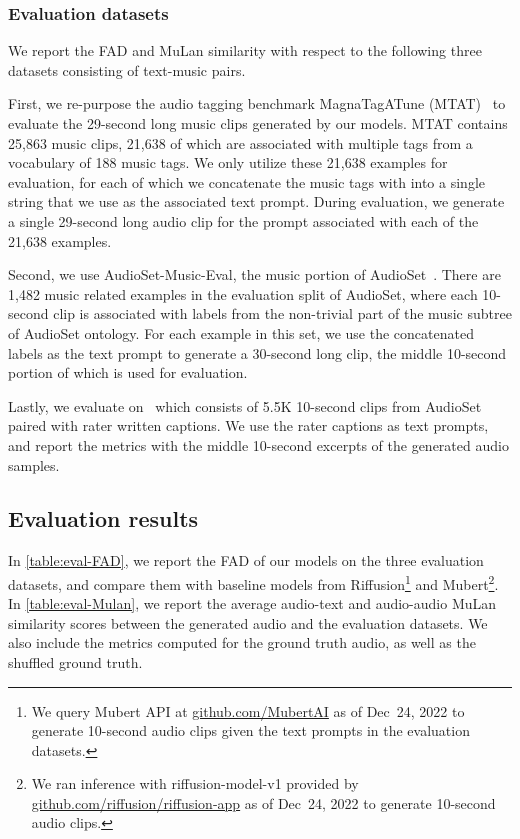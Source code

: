 \subsubsection{Evaluation datasets}

We report the FAD and MuLan similarity with respect to the following three datasets consisting of text-music pairs.

First, we re-purpose the audio tagging benchmark MagnaTagATune (MTAT)~\cite{law2009evaluation} to evaluate the 29-second long music clips generated by our models.
MTAT contains 25,863 music clips, 21,638 of which are associated with multiple tags from a vocabulary of 188 music tags. We only utilize these 21,638 examples for evaluation, for each of which we concatenate the music tags with into a single string that we use as the associated text prompt. During evaluation, we generate a single 29-second long audio clip for the prompt associated with each of the 21,638 examples.

Second, we use AudioSet-Music-Eval, the music portion of AudioSet~\cite{gemmeke2017audio}. There are 1,482 music related examples in the evaluation split of AudioSet, where each 10-second clip is associated with labels from the non-trivial part of the music subtree of AudioSet ontology. For each example in this set, we use the concatenated labels as the text prompt to generate a 30-second long clip, the middle 10-second portion of which is used for evaluation. 

Lastly, we evaluate on \EvalSet~which consists of 5.5K 10-second clips from AudioSet paired with rater written captions. We use the rater captions as text prompts, and report the metrics with the middle 10-second excerpts of the generated audio samples.

\subsection{Evaluation results}
In \cref{table:eval-FAD}, we report the FAD of our models on the three evaluation datasets, and compare them with baseline models from Riffusion\footnote{We query Mubert API at \href{https://github.com/MubertAI}{github.com/MubertAI} as of Dec~24, 2022 to generate 10-second audio clips given the text prompts in the evaluation datasets.} and Mubert\footnote{We ran inference with riffusion-model-v1 provided by \href{https://github.com/riffusion/riffusion-app}{github.com/riffusion/riffusion-app} as of Dec~24, 2022 to generate 10-second audio clips.}. 
In \cref{table:eval-Mulan}, we report the average audio-text and audio-audio MuLan similarity scores between the generated audio and the evaluation datasets. We also include the metrics computed for the ground truth audio, as well as the shuffled ground truth.

